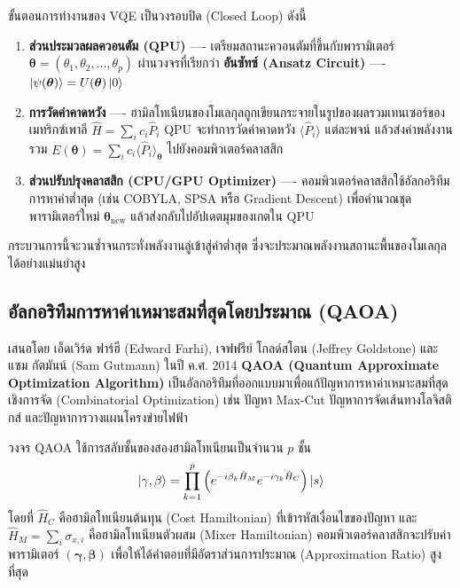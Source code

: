 ขั้นตอนการทำงานของ VQE เป็นวงรอบปิด (Closed Loop) ดังนี้
\begin{enumerate}
    \item \textbf{ส่วนประมวลผลควอนตัม (QPU)} ---- เตรียมสถานะควอนตัมที่ขึ้นกับพารามิเตอร์ $\boldsymbol{\theta} = (\theta_1, \theta_2, \dots, \theta_p)$ ผ่านวงจรที่เรียกว่า \textbf{อันซัทซ์ (Ansatz Circuit)} ---- $\ket{\psi(\boldsymbol{\theta})} = U(\boldsymbol{\theta})\ket{0}$
    \item \textbf{การวัดค่าคาดหวัง} ---- ฮามิลโทเนียนของโมเลกุลถูกเขียนกระจายในรูปของผลรวมเทนเซอร์ของเมทริกซ์เพาลี $\hat{H} = \sum_i c_i \hat{P}_i$ QPU จะทำการวัดค่าคาดหวัง $\langle \hat{P}_i \rangle$ แต่ละพจน์ แล้วส่งค่าพลังงานรวม $E(\boldsymbol{\theta}) = \sum_i c_i \langle \hat{P}_i \rangle_{\boldsymbol{\theta}}$ ไปยังคอมพิวเตอร์คลาสสิก
    \item \textbf{ส่วนปรับปรุงคลาสสิก (CPU/GPU Optimizer)} ---- คอมพิวเตอร์คลาสสิกใช้อัลกอริทึมการหาค่าต่ำสุด (เช่น COBYLA, SPSA หรือ Gradient Descent) เพื่อคำนวณชุดพารามิเตอร์ใหม่ $\boldsymbol{\theta}_{\text{new}}$ แล้วส่งกลับไปอัปเดตมุมของเกตใน QPU
\end{enumerate}
กระบวนการนี้จะวนซ้ำจนกระทั่งพลังงานลู่เข้าสู่ค่าต่ำสุด ซึ่งจะประมาณพลังงานสถานะพื้นของโมเลกุลได้อย่างแม่นยำสูง

\subsection{อัลกอริทึมการหาค่าเหมาะสมที่สุดโดยประมาณ (QAOA)}
เสนอโดย เอ็ดเวิร์ด ฟาร์ฮี (Edward Farhi), เจฟฟรีย์ โกลด์สโตน (Jeffrey Goldstone) และ แซม กัตมันน์ (Sam Gutmann) ในปี ค.ศ. 2014 \textbf{QAOA (Quantum Approximate Optimization Algorithm)} เป็นอัลกอริทึมที่ออกแบบมาเพื่อแก้ปัญหาการหาค่าเหมาะสมที่สุดเชิงการจัด (Combinatorial Optimization) เช่น ปัญหา Max-Cut ปัญหาการจัดเส้นทางโลจิสติกส์ และปัญหาการวางแผนโครงข่ายไฟฟ้า

วงจร QAOA ใช้การสลับชั้นของสองฮามิลโทเนียนเป็นจำนวน $p$ ชั้น
\begin{equation}
\ket{\gamma, \beta} = \prod_{k=1}^p \left( e^{-i\beta_k \hat{H}_M} e^{-i\gamma_k \hat{H}_C} \right) \ket{s}
\label{eq:qaoa_state_ansatz}
\end{equation}
โดยที่ $\hat{H}_C$ คือฮามิลโทเนียนต้นทุน (Cost Hamiltonian) ที่เข้ารหัสเงื่อนไขของปัญหา และ $\hat{H}_M = \sum_i \sigma_{x,i}$ คือฮามิลโทเนียนตัวผสม (Mixer Hamiltonian) คอมพิวเตอร์คลาสสิกจะปรับค่าพารามิเตอร์ $(\boldsymbol{\gamma}, \boldsymbol{\beta})$ เพื่อให้ได้คำตอบที่มีอัตราส่วนการประมาณ (Approximation Ratio) สูงที่สุด

